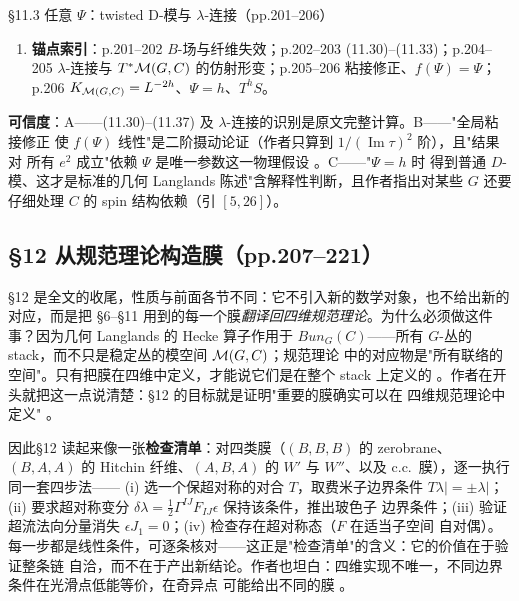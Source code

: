 \begin{kcard}{\S11.3 任意 $\Psi$：twisted D-模与 $\lambda$-连接（pp.201--206）}
\begin{enumerate}[label=\textbf{\arabic*}]
  几何 Langlands $=$ $S$-对偶 $+$ $T^h$" 的表述；这也是全文末尾回扣开头 S1 的地方。
\item \textbf{锚点索引}：p.201--202 $B$-场与纤维失效；p.202--203 (11.30)--(11.33)；p.204--205
  $\lambda$-连接与 $T^*\mathcal{M}(G,C)$ 的仿射形变；p.205--206 粘接修正、$f(\Psi)=\Psi$；p.206
  $K_{\mathcal{M}(G,C)}=L^{-2h}$、$\Psi=h$、$T^hS$。
\end{enumerate}
\textbf{可信度}：A——(11.30)--(11.37) 及 $\lambda$-连接的识别是原文完整计算。B——"全局粘接修正
使 $f(\Psi)$ 线性"是二阶摄动论证（作者只算到 $1/(\operatorname{Im}\tau)^2$ 阶），且"结果对
所有 $e^2$ 成立"依赖 $\Psi$ 是唯一参数这一物理假设 \pB{}。C——"$\Psi=h$ 时
得到普通 $D$-模、这才是标准的几何 Langlands 陈述"含解释性判断，且作者指出对某些 $G$ 还要
仔细处理 $C$ 的 spin 结构依赖（引 $[5,26]$）\pC{}。
\end{kcard}

\subsection{\S12 从规范理论构造膜（pp.207--221）}

\S12 是全文的收尾，性质与前面各节不同：它不引入新的数学对象，也不给出新的对应，而是把
\S6--\S11 用到的每一个膜\emph{翻译回四维规范理论}。为什么必须做这件事？因为几何 Langlands 的
Hecke 算子作用于 $Bun_G(C)$——所有 $G$-丛的 stack，而不只是稳定丛的模空间 $\mathcal{M}(G,C)$；规范理论
中的对应物是"所有联络的空间"。只有把膜在四维中定义，才能说它们是在整个 stack 上定义的
\pA{}。作者在开头就把这一点说清楚：\S12 的目标就是证明"重要的膜确实可以在
四维规范理论中定义" \pA{}。

因此\S12 读起来像一张\textbf{检查清单}：对四类膜（$(B,B,B)$ 的 zerobrane、$(B,A,A)$ 的
Hitchin 纤维、$(A,B,A)$ 的 $W'$ 与 $W''$、以及 c.c.\ 膜），逐一执行同一套四步法——
(i) 选一个保超对称的对合 $T$，取费米子边界条件 $T\lambda|=\pm\lambda|$；
(ii) 要求超对称变分 $\delta\lambda=\frac12\Gamma^{IJ}F_{IJ}\epsilon$ 保持该条件，推出玻色子
边界条件；(iii) 验证超流法向分量消失 $\epsilon J_1=0$；(iv) 检查存在超对称态（$F$ 在适当子空间
自对偶）。每一步都是线性条件，可逐条核对——这正是"检查清单"的含义：它的价值在于验证整条链
自洽，而不在于产出新结论。作者也坦白：四维实现不唯一，不同边界条件在光滑点低能等价，在奇异点
可能给出不同的膜 \pA{}。

